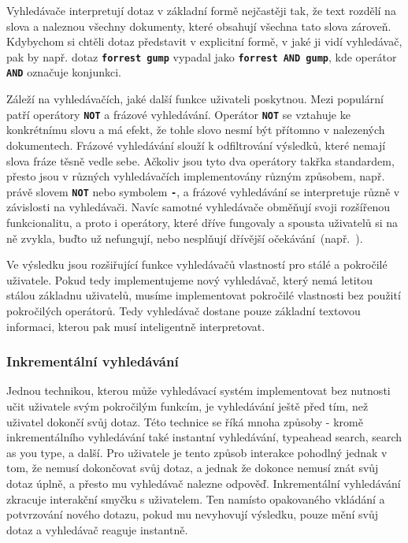 \documentclass[11pt,letterpaper,oneside,openright]{book}
\newcommand{\bftt}[1]{\texttt{\textbf{#1}}}
\begin{document}

Vyhledávače interpretují dotaz v základní formě nejčastěji tak, že text rozdělí
na slova a naleznou všechny dokumenty, které obsahují všechna tato slova
zároveň.  Kdybychom si chtěli dotaz představit v explicitní formě, v jaké ji
vidí vyhledávač, pak by např. dotaz \bftt{forrest gump} vypadal jako
\bftt{forrest AND gump}, kde operátor \bftt{AND} označuje konjunkci.

Záleží na vyhledávačích, jaké další funkce uživateli poskytnou. Mezi populární
patří operátory \bftt{NOT} a frázové vyhledávání. Operátor \bftt{NOT} se
vztahuje ke konkrétnímu slovu a má efekt, že tohle slovo nesmí být přítomno v
nalezených dokumentech. Frázové vyhledávání slouží k odfiltrování výsledků,
které nemají slova fráze těsně vedle sebe. Ačkoliv jsou tyto dva operátory
takřka standardem, přesto jsou v různých vyhledávačích implementovány různým
způsobem, např. právě slovem \bftt{NOT} nebo symbolem \bftt{-}, a frázové
vyhledávání se interpretuje různě v závislosti na vyhledávači. Navíc samotné
vyhledávače obměňují svoji rozšířenou funkcionalitu, a proto i operátory, které
dříve fungovaly a spousta uživatelů si na ně zvykla, buďto už nefungují, nebo
nesplňují dřívější
očekávání~(např.~\cite{google_operator_kill1,google_operator_kill2}).

Ve výsledku jsou rozšiřující funkce vyhledávačů vlastností pro stálé a
pokročilé uživatele. Pokud tedy implementujeme nový vyhledávač, který nemá
letitou stálou základnu uživatelů, musíme implementovat pokročilé vlastnosti
bez použití pokročilých operátorů. Tedy vyhledávač dostane pouze základní
textovou informaci, kterou pak musí inteligentně interpretovat.

\subsubsection{Inkrementální vyhledávání} \label{sec:inkrementalni_vyhledavani}
Jednou technikou, kterou může vyhledávací systém implementovat bez nutnosti
učit uživatele svým pokročilým funkcím, je vyhledávání ještě před tím, než
uživatel dokončí svůj dotaz. Této technice se říká mnoha způsoby - kromě
inkrementálního vyhledávání také instantní vyhledávání, typeahead search,
search as you type, a další. Pro uživatele je tento způsob interakce pohodlný
jednak v tom, že nemusí dokončovat svůj dotaz, a jednak že dokonce nemusí znát
svůj dotaz úplně, a přesto mu vyhledávač nalezne odpověď. Inkrementální
vyhledávání zkracuje interakční smyčku s uživatelem. Ten namísto opakovaného
vkládání a potvrzování nového dotazu, pokud mu nevyhovují výsledku, pouze mění
svůj dotaz a vyhledávač reaguje instantně.
\end{document}
